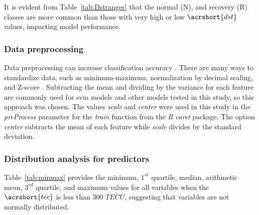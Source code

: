\let\LaTeXcline\cline\documentclass[sn-mathphys-num]{sn-jnl}\let\cline\LaTeXcline
\begin{document}
It is evident from Table~\ref{tab:Dstranges} that the normal (N), and recovery (R) classes are more common than those with very high or low $\acrshort{dst}$ values, impacting model performance.

\subsubsection{Data preprocessing}

Data preprocessing can increase classification accuracy \cite{Fan2008}. There are many ways to standardize data, such as minimum-maximum, normalization by decimal scaling, and Z-score \cite{Mohamad2013}. Subtracting the mean and dividing by the variance for each feature are commonly used for \acrshort{svm} models \cite{Fennell2019} and other models tested in this study, so this approach was chosen. The values \textit{scale} and \textit{center} were used in this study in the \textit{preProcess} parameter for the \textit{train} function from the \textit{R} \textit{caret} package. The option \textit{center} subtracts the mean of each feature while \textit{scale} divides by the standard deviation.

\subsubsection{Distribution analysis for predictors}

Table~\ref{tab:minmax} provides the minimum, $1^{st}$ quartile, median, arithmetic mean, $3^{rd}$ quartile, and maximum values for all variables when the $\acrshort{tec}$ is less than $300$ $TECU$, suggesting that variables are not normally distributed.
\end{document}

